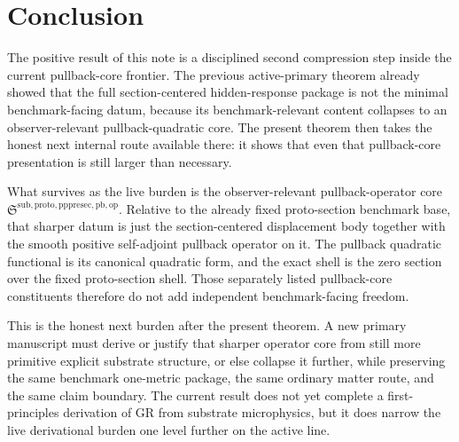 \documentclass[11pt]{article}
\newcommand{\PullbackOperatorCore}{\mathfrak S^{\mathrm{sub,proto,pppresec,pb,op}}}
\begin{document}
\section{Conclusion}

The positive result of this note is a disciplined second compression step inside the current pullback-core frontier. The previous active-primary theorem already showed that the full section-centered hidden-response package is not the minimal benchmark-facing datum, because its benchmark-relevant content collapses to an observer-relevant pullback-quadratic core. The present theorem then takes the honest next internal route available there: it shows that even that pullback-core presentation is still larger than necessary.

What survives as the live burden is the observer-relevant pullback-operator core \(\PullbackOperatorCore\). Relative to the already fixed proto-section benchmark base, that sharper datum is just the section-centered displacement body together with the smooth positive self-adjoint pullback operator on it. The pullback quadratic functional is its canonical quadratic form, and the exact shell is the zero section over the fixed proto-section shell. Those separately listed pullback-core constituents therefore do not add independent benchmark-facing freedom.

This is the honest next burden after the present theorem. A new primary manuscript must derive or justify that sharper operator core from still more primitive explicit substrate structure, or else collapse it further, while preserving the same benchmark one-metric package, the same ordinary matter route, and the same claim boundary. The current result does not yet complete a first-principles derivation of GR from substrate microphysics, but it does narrow the live derivational burden one level further on the active line.
\end{document}
